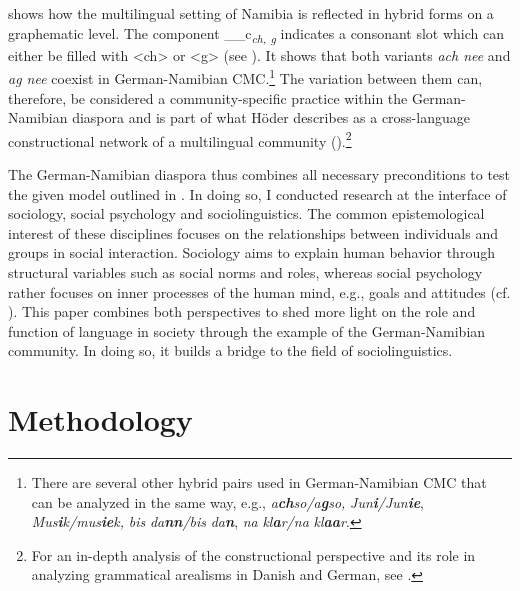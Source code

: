 \documentclass[output=paper]{langsci/langscibook}
\begin{document}
 shows how the multilingual setting of Namibia is reflected in hybrid forms on a graphematic level. The component \_\_c\textit{\textsubscript{ch, g}} {indicates a consonant slot which can either be filled with <ch> or <g> (see \citealt[16]{hoder_mehrsprachige_2018}). It shows that both variants} \textit{ach nee} {and} \textit{ag nee} {coexist in German-Namibian CMC.}\footnote{There are several other hybrid pairs used in German-Namibian CMC that can be analyzed in the same way, e.g., \textit{a}\textbf{\textit{ch}}\textit{so/a}\textbf{\textit{g}}\textit{so,} \textit{Jun}\textbf{\textit{i}}\textit{/Jun}\textbf{\textit{ie}}, \textit{Mus}\textbf{\textit{i}}\textit{k/mus}\textbf{\textit{ie}}\textit{k,} \textit{bis} \textit{da}\textbf{\textit{nn}}\textit{/bis} \textit{da}\textbf{\textit{n}}, \textit{na} \textit{kl}\textbf{\textit{a}}\textit{r/na} \textit{kl}\textbf{\textit{aa}}\textit{r}.} The variation between them can, therefore, be considered a community-specific practice within the German-Namibian diaspora and is part of what Höder describes as a cross-language constructional network of a multilingual community (\citealt[15]{hoder_mehrsprachige_2018}).\footnote{For an in-depth analysis of the constructional perspective and its role in analyzing grammatical arealisms in Danish and German, see .} 

The German-Namibian diaspora thus combines all necessary preconditions to test the given model outlined in . In doing so, I conducted research at the interface of sociology, social psychology and sociolinguistics. The common epistemological interest of these disciplines focuses on the relationships between individuals and groups in social interaction. Sociology aims to explain human behavior through structural variables such as social norms and roles, whereas social psychology rather focuses on inner processes of the human mind, e.g., goals and attitudes (cf. \citealt[11]{jonas_sozialpsychologie_2014}). This paper combines both perspectives to shed more light on the role and function of language in society through the example of the German-Namibian community. In doing so, it builds a bridge to the field of sociolinguistics.

 
\section{Methodology}
\label{sec:radke:2}
 
\end{document}
